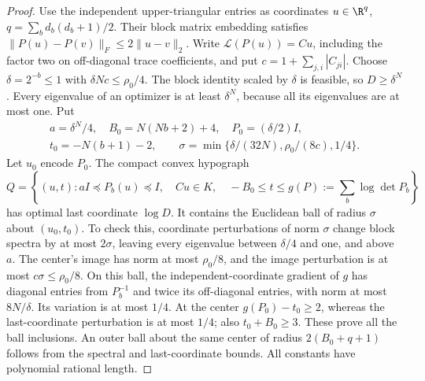 \begin{proof}
Use the independent upper-triangular entries as coordinates
$u\in\R^q$, $q=\sum_bd_b(d_b+1)/2$. Their block matrix embedding
satisfies $\|P(u)-P(v)\|_F\le2\|u-v\|_2$. Write
$\mathcal L(P(u))=Cu$, including the factor two on off-diagonal trace
coefficients, and put $c=1+\sum_{j,i}|C_{ji}|$. Choose
$\delta=2^{-b}\le1$ with $\delta Nc\le\rho_0/4$. The block identity
scaled by $\delta$ is feasible, so $D\ge\delta^N$. Every eigenvalue
of an optimizer is at least $\delta^N$, because all its eigenvalues
are at most one. Put
\[
 \begin{gathered}
 a=\delta^N/4,\quad B_0=N(Nb+2)+4,\quad P_0=(\delta/2)I,\\
 t_0=-N(b+1)-2,\qquad
 \sigma=\min\{\delta/(32N),\rho_0/(8c),1/4\}.
 \end{gathered}
\]
Let $u_0$ encode $P_0$. The compact convex hypograph
\begin{equation}\label{eq:logdet-hypograph}
 Q=\left\{(u,t):aI\preceq P_b(u)\preceq I,\quad Cu\in K,\quad
                -B_0\le t\le g(P):=\sum_b\log\det P_b\right\}
\end{equation}
has optimal last coordinate $\log D$. It contains the Euclidean ball
of radius $\sigma$ about $(u_0,t_0)$. To check this, coordinate
perturbations of norm $\sigma$ change block spectra by at most
$2\sigma$, leaving every eigenvalue between $\delta/4$ and one, and
above $a$. The center's image has norm at most $\rho_0/8$, and the
image perturbation is at most $c\sigma\le\rho_0/8$. On this ball,
the independent-coordinate gradient of $g$ has diagonal entries from
$P_b^{-1}$ and twice its off-diagonal entries, with norm at most
$8N/\delta$. Its variation is at most $1/4$. At the center
$g(P_0)-t_0\ge2$, whereas the last-coordinate perturbation is at most
$1/4$; also $t_0+B_0\ge3$. These prove all the ball inclusions.
An outer ball about the same center of radius $2(B_0+q+1)$ follows
from the spectral and last-coordinate bounds. All constants have
polynomial rational length.


\end{proof}
